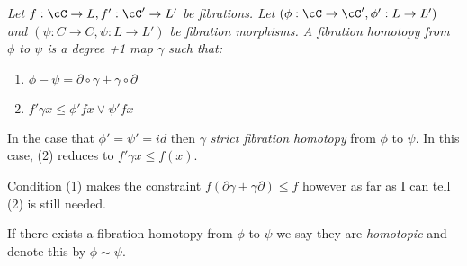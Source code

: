 \begin{defn}
{\em
Let $f:\cC\to L,f':\cC'\to L'$ be fibrations.  Let $(\phi:\cC\to \cC',\phi':L\to L')$ and $(\psi:C\to C, \psi:L\to L')$ be fibration morphisms.  A {\em fibration homotopy} from $\phi$ to $\psi$ is a degree +1 map $\gamma$ such that:
\begin{enumerate}
\item $\phi - \psi = \partial\circ \gamma + \gamma\circ \partial$
\item $f'\gamma x \leq \phi' fx \vee \psi ' fx$

\end{enumerate}



In the case that $\phi'=\psi'=id$ then $\gamma$ {\em strict fibration homotopy} from $\phi$ to $\psi$.  In this case, (2) reduces to $f'\gamma x \leq f(x)$.
}
\end{defn}

\begin{rem}
Condition (1) makes the constraint $f(\partial\gamma+\gamma\partial)\leq f$ however as far as I can tell (2) is still needed.
\end{rem}

If there exists a fibration homotopy from $\phi$ to $\psi$ we say they are {\em homotopic} and denote this by $\phi\sim \psi$.

